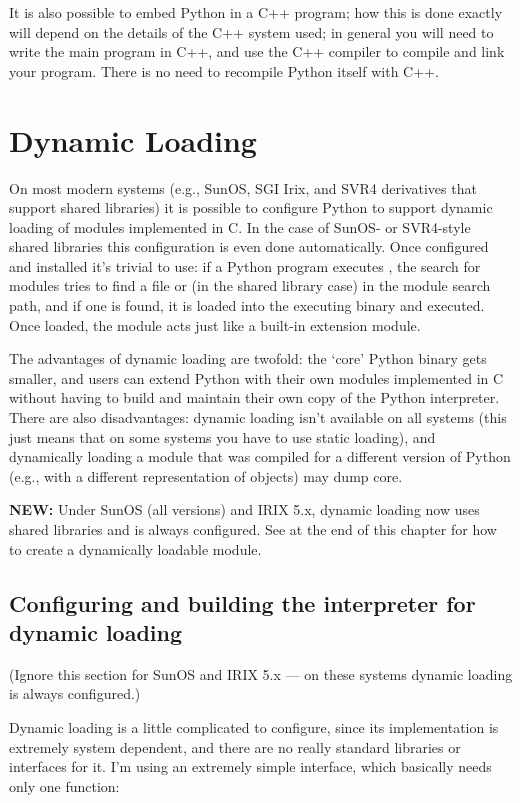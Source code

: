 It is also possible to embed Python in a C++ program; how this is done
exactly will depend on the details of the C++ system used; in general
you will need to write the main program in C++, and use the C++
compiler to compile and link your program.  There is no need to
recompile Python itself with C++.


\chapter{Dynamic Loading}

On most modern systems (e.g., SunOS, SGI Irix, and SVR4 derivatives
that support shared libraries) it is possible to configure Python to
support dynamic loading of modules implemented in C.  In the case of
SunOS- or SVR4-style shared libraries this configuration is even done
automatically.  Once configured and installed it's trivial to use: if
a Python program executes , the search for modules
tries to find a file  or  (in the
shared library case) in the module search path, and if one is found,
it is loaded into the executing binary and executed.  Once loaded, the
module acts just like a built-in extension module.

The advantages of dynamic loading are twofold: the `core' Python
binary gets smaller, and users can extend Python with their own
modules implemented in C without having to build and maintain their
own copy of the Python interpreter.  There are also disadvantages:
dynamic loading isn't available on all systems (this just means that
on some systems you have to use static loading), and dynamically
loading a module that was compiled for a different version of Python
(e.g., with a different representation of objects) may dump core.

{\bf NEW:} Under SunOS (all versions) and IRIX 5.x, dynamic loading
now uses shared libraries and is always configured.  See at the
end of this chapter for how to create a dynamically loadable module.


\section{Configuring and building the interpreter for dynamic loading}

(Ignore this section for SunOS and IRIX 5.x --- on these systems
dynamic loading is always configured.)

Dynamic loading is a little complicated to configure, since its
implementation is extremely system dependent, and there are no
really standard libraries or interfaces for it.  I'm using an
extremely simple interface, which basically needs only one function:

